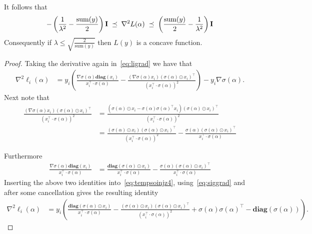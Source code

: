 \documentclass[11pt]{article}
\newcommand{\diag}[1]{\mathbf{diag}\left( #1\right)}
\newcommand{\mI}{{\bf I}}
\begin{document}
\begin{lemma}
It follows that 
\begin{equation}\label{eq:Lhess}
-\left(\frac{1}{\lambda^2}-\frac{ \mbox{sum}(y)}{2}\right)  \mI  \; \preceq \; \nabla^2 L(\alpha) \; \preceq \; \left(\frac{ \mbox{sum}(y)}{2}-\frac{1}{\lambda^2} \right) \mI
\end{equation}
Consequently if $\lambda \leq \sqrt{\tfrac{2}{ \mbox{sum}(y)}}$ then $L(y)$ is a concave function.
\end{lemma}
\begin{proof}
Taking the derivative again in~\eqref{eq:ligrad} we have that
\begin{align}
\nabla^2 \ell_i(\alpha) & =   y_i \left(\frac{\nabla \sigma(\alpha)  \diag{ x_i}}{ x_i^{\top} \cdot \sigma(\alpha) } - \frac{ (\nabla \sigma(\alpha) x_i)(\sigma(\alpha)  \odot x_i)^\top}{( x_i^{\top} \cdot \sigma(\alpha) )^2}  \right) -y_i\nabla \sigma(\alpha). \label{eq:tempsoinjz4}
\end{align}
    Next note that 
    \begin{align*}
        \frac{ (\nabla \sigma(\alpha) x_i)(\sigma(\alpha)  \odot x_i)^\top}{( x_i^{\top} \cdot \sigma(\alpha) )^2} & = \frac{ (\sigma(\alpha) \odot x_i - \sigma(\alpha)  \sigma(\alpha) ^\top x_i )(\sigma(\alpha)  \odot x_i)^\top}{( x_i^{\top} \cdot \sigma(\alpha) )^2} \\
        &= \frac{ (\sigma(\alpha) \odot x_i) (\sigma(\alpha) \odot x_i)^\top  }{( x_i^{\top} \cdot \sigma(\alpha) )^2} - \frac{\sigma(\alpha) (\sigma(\alpha) \odot x_i)^\top } { x_i^{\top} \cdot \sigma(\alpha) }
    \end{align*}

Furthermore
\begin{align*}
    \frac{\nabla \sigma(\alpha)  \diag{ x_i}}{ x_i^{\top} \cdot \sigma(\alpha) } & = \frac{  \diag{\sigma(\alpha)\odot x_i}}{ x_i^{\top} \cdot \sigma(\alpha) } -\frac{\sigma(\alpha) (\sigma(\alpha) \odot x_i)^\top }{ x_i^{\top} \cdot \sigma(\alpha) }
\end{align*}
Inserting the above two identities into~\eqref{eq:tempsoinjz4}, using~\eqref{eq:siggrad} and after some cancellation gives the resulting identity
\begin{align}
\nabla^2 \ell_i(\alpha)& = y_i \left(\frac{  \diag{\sigma(\alpha)\odot x_i}  }{ x_i^{\top} \cdot \sigma(\alpha) } -\frac{ (\sigma(\alpha) \odot x_i) (\sigma(\alpha) \odot x_i)^\top  }{( x_i^{\top} \cdot \sigma(\alpha) )^2}  +\sigma(\alpha)\sigma(\alpha)^\top - \diag{\sigma(\alpha)}\right). \label{eq:tempsoinjz4}
\end{align}


\end{proof}
\end{document}
